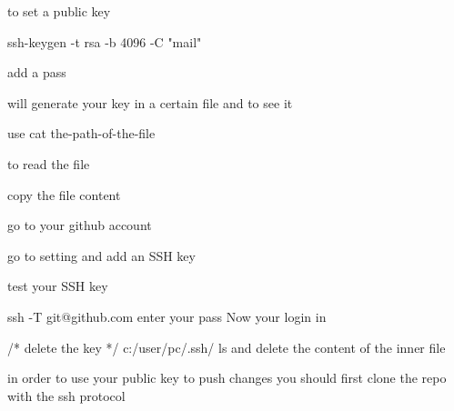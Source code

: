 to set a public key  

ssh-keygen -t rsa -b 4096 -C "mail" 

add a pass 

will generate your key in a certain file and to see it 

use cat the-path-of-the-file  

to read the file 

copy the file content 

go to your github account 

go to setting and add an SSH key 

test your SSH key 

ssh -T git@github.com 
enter your pass 
Now your login in 

/* delete the key */
c:/user/pc/.ssh/
ls 
and delete the content of the inner file 

in order to use your public key to push changes you should first clone the repo 
with the ssh protocol 